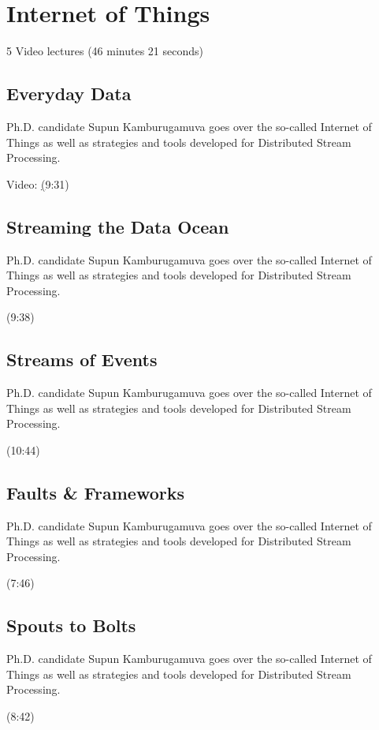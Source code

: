 \section{Internet of Things}




  5 Video lectures (46 minutes 21 seconds)


\subsection{Everyday Data}

Ph.D. candidate Supun Kamburugamuva goes over the so-called Internet of
Things as well as strategies and tools developed for Distributed Stream
Processing.




  Video:
  \href{https://www.youtube.com/watch?time_continue=9\&v=brv48Tg7Zyw}
  (9:31)


\subsection{Streaming the Data Ocean}

Ph.D. candidate Supun Kamburugamuva goes over the so-called Internet of
Things as well as strategies and tools developed for Distributed Stream
Processing.




  (9:38)


\subsection{Streams of Events}

Ph.D. candidate Supun Kamburugamuva goes over the so-called Internet of
Things as well as strategies and tools developed for Distributed Stream
Processing.




  (10:44)


\subsection{Faults \& Frameworks}

Ph.D. candidate Supun Kamburugamuva goes over the so-called Internet of
Things as well as strategies and tools developed for Distributed Stream
Processing.




  (7:46)


\subsection{Spouts to Bolts}

Ph.D. candidate Supun Kamburugamuva goes over the so-called Internet of
Things as well as strategies and tools developed for Distributed Stream
Processing.




  (8:42)

